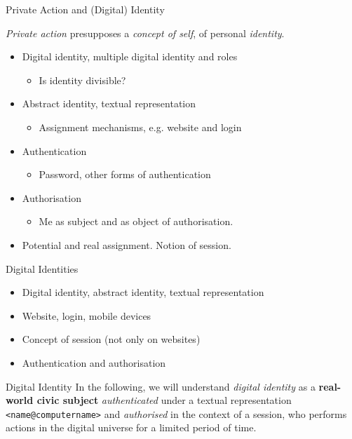 \documentclass{beamer}
\begin{document}
\begin{frame}{Private Action and (Digital) Identity}

\emph{Private action} presupposes a \emph{concept of self}, of personal
\emph{identity}.
\begin{itemize}
\item Digital identity, multiple digital identity and roles
  \begin{itemize}
  \item[] Is identity divisible?
  \end{itemize}
\item Abstract identity, textual representation
  \begin{itemize}
  \item[] Assignment mechanisms, e.g. website and login
  \end{itemize}
\item Authentication
  \begin{itemize}
  \item[] Password, other forms of authentication
  \end{itemize}
\item Authorisation
  \begin{itemize}
  \item[] Me as subject and as object of authorisation.
  \end{itemize}
\item Potential and real assignment. Notion of session.
\end{itemize}
\end{frame}
\begin{frame}{Digital Identities}
\begin{itemize}
\item Digital identity, abstract identity, textual representation
\item Website, login, mobile devices
\item Concept of session (not only on websites)
\item Authentication and authorisation
\end{itemize}
\begin{block}{Digital Identity}
  In the following, we will understand \emph{digital identity} as a
  \textbf{real-world civic subject} \emph{authenticated} under a textual
  representation \texttt{<name@computername>} and \emph{authorised} in the
  context of a session, who performs actions in the digital universe for a
  limited period of time.
\end{block}
\end{frame}
\end{document}
